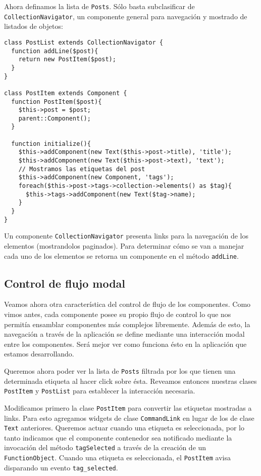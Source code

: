 Ahora definamos la lista de \verb"Posts". Sólo basta subclasificar de \verb"CollectionNavigator", un componente general para navegación y mostrado de listados de objetos:

\begin{verbatim}
class PostList extends CollectionNavigator {
  function addLine($post){
    return new PostItem($post);
  }
}

class PostItem extends Component {
  function PostItem($post){
    $this->post = $post;
    parent::Component();
  }

  function initialize(){
    $this->addComponent(new Text($this->post->title), 'title');
    $this->addComponent(new Text($this->post->text), 'text');
    // Mostramos las etiquetas del post
    $this->addComponent(new Component, 'tags');
    foreach($this->post->tags->collection->elements() as $tag){
      $this->tags->addComponent(new Text($tag->name);
    }
  }
}

\end{verbatim}

Un componente \verb"CollectionNavigator" presenta links para la navegación de los elementos (mostrandolos paginados). Para determinar cómo se van a manejar cada uno de los elementos se retorna un componente en el método \verb"addLine".

\subsection{Control de flujo modal}
\label{sub-modal-flow}
Veamos ahora otra característica del control de flujo de los componentes. Como vimos antes, cada componente posee su propio flujo de control lo que nos permitía ensamblar componentes más complejos libremente. Además de esto, la navegación a través de la aplicación se define mediante una interacción modal entre los componentes. Será mejor ver como funciona ésto en la aplicación que estamos desarrollando.

Queremos ahora poder ver la lista de \verb"Posts" filtrada por los que tienen una determinada etiqueta al hacer click sobre ésta. Reveamos entonces nuestras clases \verb"PostItem" y \verb"PostList" para establecer la interacción necesaria.

Modificamos primero la clase \verb"PostItem" para convertir las etiquetas mostradas a links. Para esto agregamos widgets de clase \verb"CommandLink" en lugar de los de clase \verb"Text" anteriores. Queremos actuar cuando una etiqueta es seleccionada, por lo tanto indicamos que el componente contenedor sea notificado mediante la invocación del método \verb"tagSelected" a través de la creación de un \verb"FunctionObject". Cuando una etiqueta es seleccionada, el \verb"PostItem" avisa disparando  un evento \verb"tag_selected".

